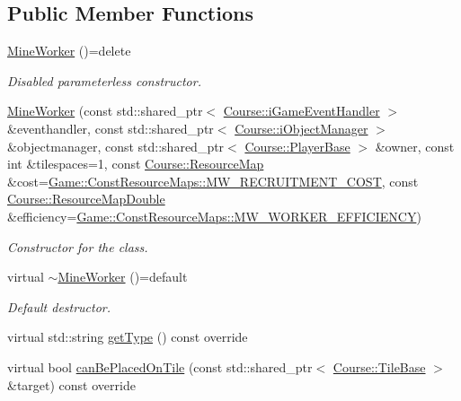 \subsection*{Public Member Functions}
\begin{DoxyCompactItemize}
\item 
\hyperlink{classGame_1_1MineWorker_a1b8706b2cbc8b5f84140230e432c8250}{Mine\-Worker} ()=delete
\begin{DoxyCompactList}\small\item\em Disabled parameterless constructor. \end{DoxyCompactList}\item 
\hyperlink{classGame_1_1MineWorker_a2d34cfd55b44b6012d9029ea66e8a7b4}{Mine\-Worker} (const std\-::shared\-\_\-ptr$<$ \hyperlink{classCourse_1_1iGameEventHandler}{Course\-::i\-Game\-Event\-Handler} $>$ \&eventhandler, const std\-::shared\-\_\-ptr$<$ \hyperlink{classCourse_1_1iObjectManager}{Course\-::i\-Object\-Manager} $>$ \&objectmanager, const std\-::shared\-\_\-ptr$<$ \hyperlink{classCourse_1_1PlayerBase}{Course\-::\-Player\-Base} $>$ \&owner, const int \&tilespaces=1, const \hyperlink{namespaceCourse_ab9a46ed9cd00485e318e5731ea2f78d9}{Course\-::\-Resource\-Map} \&cost=\hyperlink{namespaceGame_1_1ConstResourceMaps_ad5d316811f8c8442f6c24b5dc9134a87}{Game\-::\-Const\-Resource\-Maps\-::\-M\-W\-\_\-\-R\-E\-C\-R\-U\-I\-T\-M\-E\-N\-T\-\_\-\-C\-O\-S\-T}, const \hyperlink{namespaceCourse_a0b96bae1a664dde34efbb1b42dea615e}{Course\-::\-Resource\-Map\-Double} \&efficiency=\hyperlink{namespaceGame_1_1ConstResourceMaps_a11fc543cda6cf6dbd703559e230eb49a}{Game\-::\-Const\-Resource\-Maps\-::\-M\-W\-\_\-\-W\-O\-R\-K\-E\-R\-\_\-\-E\-F\-F\-I\-C\-I\-E\-N\-C\-Y})
\begin{DoxyCompactList}\small\item\em Constructor for the class. \end{DoxyCompactList}\item 
virtual \hyperlink{classGame_1_1MineWorker_a07f3a09a2c95491de57f1511a8162c43}{$\sim$\-Mine\-Worker} ()=default
\begin{DoxyCompactList}\small\item\em Default destructor. \end{DoxyCompactList}\item 
virtual std\-::string \hyperlink{classGame_1_1MineWorker_a984c2ede11ac50460620a4d982249dbe}{get\-Type} () const override
\item 
virtual bool \hyperlink{classGame_1_1MineWorker_aa52833ec99f6746871a78467c51bc57e}{can\-Be\-Placed\-On\-Tile} (const std\-::shared\-\_\-ptr$<$ \hyperlink{classCourse_1_1TileBase}{Course\-::\-Tile\-Base} $>$ \&target) const override

\end{DoxyCompactItemize}
